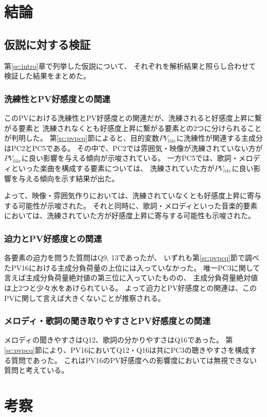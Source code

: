 \documentclass[11pt,a4paper, uplatex]{jsarticle}
\begin{document}
\section{結論}
\subsection{仮説に対する検証}
第\ref{sc:intro}章で列挙した仮説について、
それぞれを解析結果と照らし合わせて検証した結果をまとめた。
\subsubsection{洗練性とPV好感度との関連}
このPVにおける洗練性とPV好感度との関連だが、洗練されると好感度上昇に繋がる要素と
洗練されなくとも好感度上昇に繋がる要素との2つに分けられることが判明した。
第\ref{sc:pvpcq}節によると、目的変数$ PV_{like} $に洗練性が関連する主成分はPC2とPC5である。
その中で、PC2では雰囲気・映像が洗練されていない方が$ PV_{like} $に良い影響を与える傾向が示唆されている。
一方PC5では、歌詞・メロディといった楽曲を構成する要素については、
洗練されていた方が$ PV_{like} $に良い影響を与える傾向を示す結果が出た。

よって、映像・雰囲気作りにおいては、洗練されていなくとも好感度上昇に寄与する可能性が示唆された。
それと同時に、歌詞・メロディといった音楽的要素においては、洗練されていた方が好感度上昇に寄与する可能性も示唆された。

\subsubsection{迫力とPV好感度との関連}
各要素の迫力を問うた質問はQ9, 13であったが、
いずれも第\ref{sc:pvpcq}節で調べたPV16における主成分負荷量の上位には入っていなかった。
唯一PC3に関して言えば主成分負荷量絶対値の第三位に入っていたものの、
主成分負荷量絶対値は上2つと少々水をあけられている。
よって迫力とPV好感度との関連は、このPVに関して言えば大きくないことが推察される。

\subsubsection{メロディ・歌詞の聞き取りやすさとPV好感度との関連}
メロディの聞きやすさはQ12、歌詞の分かりやすさはQ16であった。
第\ref{sc:pvpcq}節により、PV16においてQ12・Q16は共にPC3の聴きやすさを構成する質問であった。
これはPV16のPV好感度への影響度においては無視できない質問と考えている。

\section{考察}
\end{document}
